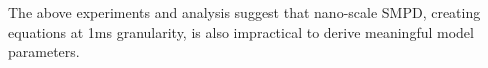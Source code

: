 

The above experiments and analysis suggest that 
nano-scale SMPD, \ie creating equations at 1ms granularity, is also impractical to derive meaningful model parameters.